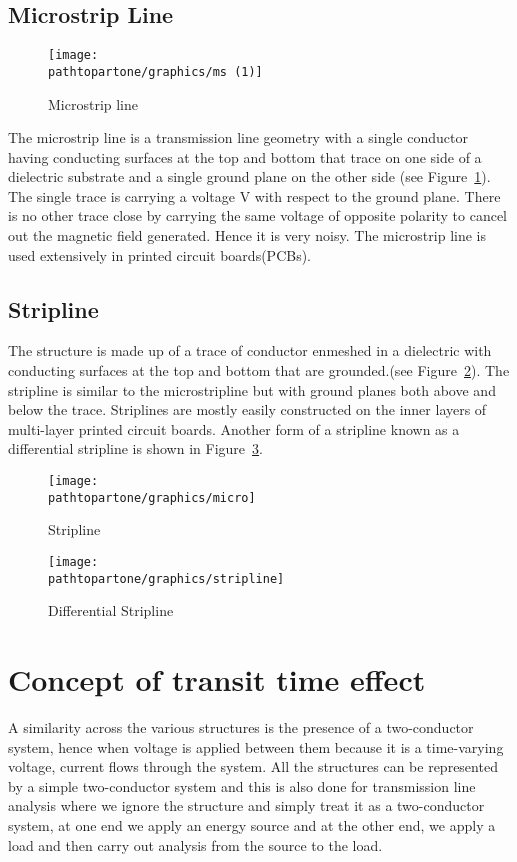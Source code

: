 \subsection{Microstrip Line}
\begin{figure}[h]
\centering
\texttt{[image: \\pathtopartone/graphics/ms (1)]}
\caption{Microstrip line}
\label{fig:micro}
\end{figure}

The microstrip line is a transmission line geometry with a single conductor having conducting surfaces at the top and bottom that trace on one side of a dielectric substrate and a single ground plane on the other side (see Figure~\ref{fig:micro}). The single trace is carrying a voltage V with respect to the ground plane. There is no other trace close by carrying the same voltage of opposite polarity to cancel out the magnetic field generated. Hence it is very noisy. The microstrip line is used extensively in printed circuit boards(PCBs).

\subsection{Stripline} 
The structure is made up of a trace of conductor enmeshed in a dielectric with conducting surfaces at the top and bottom that are grounded.(see Figure~\ref{fig:stripline}). The stripline is similar to the microstripline but with ground planes both above and below the trace. Striplines are mostly easily constructed on the inner layers of multi-layer printed circuit boards. Another form of a stripline known as a differential stripline is shown in Figure~\ref{fig:diff-stripline}.
\begin{figure}[h]
\centering
\texttt{[image: \\pathtopartone/graphics/micro]}
\caption{Stripline}
\label{fig:stripline}
\end{figure}

\begin{figure}[h]
\centering
\texttt{[image: \\pathtopartone/graphics/stripline]}
\caption{Differential Stripline}
\label{fig:diff-stripline}
\end{figure}

\section{Concept of transit time effect}
A similarity across the various structures is the presence of a two-conductor system, hence when voltage is applied between them because it is a time-varying voltage, current flows through the system. All the structures can be represented by a simple two-conductor system and this is also done for transmission line analysis where we ignore the structure and simply treat it as a two-conductor system, at one end we apply an energy source and at the other end, we apply a load and then carry out analysis from the source to the load.

